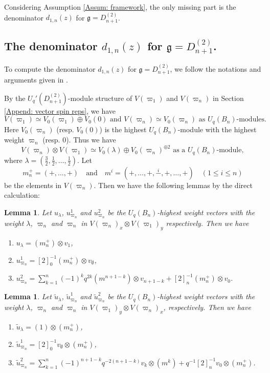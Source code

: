 \documentclass[11pt, leqno]{amsart}
\newtheorem{lemma}[theorem]{Lemma}
\theoremstyle{definition}
\numberwithin{equation}{section}
\begin{document}
Considering Assumption \eqref{Assum: framework}, the only missing part is the denominator $d_{1,n}(z)$ for ${\mathfrak g}=D^{(2)}_{n+1}$.

\subsection{The denominator $d_{1,n}(z)$ for ${\mathfrak g}=D^{(2)}_{n+1}$.} To compute the denominator $d_{1,n}(z)$ for ${\mathfrak g}=D^{(2)}_{n+1}$,
we follow the notations and arguments given in \cite[Section 4]{KMN2}.

\medskip

By the $U_q'(D^{(2)}_{n+1})$-module structure of $V({\varpi}_1)$ and $V({\varpi}_n)$ in Section \ref{Append: vector spin reps}, we have
$$V({\varpi}_1) \simeq V_0(\varpi_1) \oplus V_0(0)\text{ and }  V({\varpi}_n) \simeq
V_0({\varpi}_n) \text{ as $U_q(B_n)$-modules.}$$
Here $V_0({\varpi}_n)$ (resp. $V_0(0)$) is the highest $U_q(B_n)$-module with the highest weight ${\varpi}_n$ (resp. $0$).
Thus we have
$$V({\varpi}_n) \otimes V({\varpi}_1) \simeq V_0(\lambda) \oplus V_0(\varpi_n)^{\oplus 2}
\text{ as a $U_q(B_n)$-module}, $$
where $\lambda=(\frac{3}{2},\frac{1}{2},\ldots,\frac{1}{2})$.
Let
$$m_n^+=(+,\ldots,+) \quad \text{and} \quad  m^i=(+,\ldots,+, \overset{i}{-},+,\ldots,+) \quad (1 \le i \le n)$$ be the elements in
$V(\varpi_n)$. Then we have the following lemmas by the direct
calculation:

\begin{lemma} \label{Lem: h.w.v} Let
$u_\lambda$, $u_{\varpi_n}^1$ and $u_{\varpi_n}^2$ be the
$U_q(B_n)$-highest weight vectors with the weight $\lambda$,
$\varpi_n$ and $\varpi_n$ in $V({\varpi}_n)_x \otimes V({\varpi}_1)_y$ respectively. Then we have
\begin{enumerate}
\item[{\rm (a)}] $u_{\lambda}=(m_n^+) \otimes v_1$,
\item[{\rm (b)}] $ u_{\varpi_n}^1=  [2]_0^{-1}  (m_n^+) \otimes v_\emptyset$,
\item[{\rm (c)}] $u_{\varpi_n}^2=\sum_{k=1}^n (-1)^k q^{2k} (m^{n+1-k}) \otimes v_{n+1-k} + [2]_n^{-1} (m_n^+) \otimes v_0$.
\end{enumerate}
\end{lemma}

\begin{lemma} \label{Lem: h.w.v_2} Let
$\tilde u_\lambda$, $ \tilde u_{\varpi_n}^1$ and $ \tilde u_{\varpi_n}^2$ be the $U_q(B_n)$-highest weight vectors with the weight
$\lambda$, $\varpi_n$ and $\varpi_n$ in $V({\varpi}_1)_y \otimes V({\varpi}_n)_x$,  respectively. Then we have
\begin{enumerate}
\item[{\rm (a)}] $\tilde u_{\lambda}=(1) \otimes (m_n^+) $,
\item[{\rm (b)}] $\tilde u_{\varpi_n}^1=  [2]_0^{-1}  v_\emptyset \otimes (m_n^+)$,
\item[{\rm (c)}] $\tilde u_{\varpi_n}^2=\sum_{k=1}^n (-1)^{n+1-k} q^{-2(n+1-k)} v_k  \otimes (m^{k}) + q^{-1} [2]_n^{-1}  v_0 \otimes (m_n^+) $.
\end{enumerate}
\end{lemma}
\end{document}
